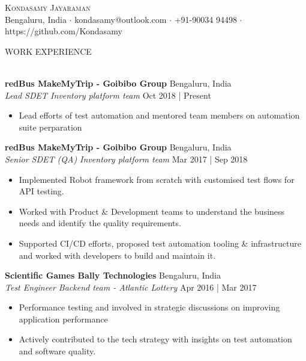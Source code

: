 \documentclass[a4paper]{article}
\newcommand{\lineunder} {
    \vspace*{-8pt} \\
    \hspace*{-18pt} \hrulefill \\
}
\newcommand{\header} [1] {
    {\hspace*{-18pt}\vspace*{6pt} \textsc{#1}}
    \vspace*{-6pt} \lineunder
}
\begin{document}
\vspace*{-40pt}

    

\vspace*{-10pt}
\begin{center}
	{\Huge \scshape {Kondasamy Jayaraman}}\\
	Bengaluru, India $\cdot$ kondasamy@outlook.com $\cdot$ +91-90034 94498 $\cdot$ https://github.com/Kondasamy\\
\end{center}

\header{WORK EXPERIENCE}
\vspace{1mm}

\textbf{redBus \textbar{} MakeMyTrip - Goibibo Group} \hfill Bengaluru, India\\
\textit{Lead SDET \textbar{} Inventory platform team} \hfill Oct 2018 | Present\\
\vspace{-1mm}
\begin{itemize} \itemsep 1pt
	\item Lead efforts of test automation and mentored team members on automation suite perparation
\end{itemize}
\textbf{redBus \textbar{} MakeMyTrip - Goibibo Group} \hfill Bengaluru, India\\
\textit{Senior SDET (QA) \textbar{} Inventory platform team} \hfill Mar 2017 | Sep 2018\\
\vspace{-1mm}
\begin{itemize} \itemsep 1pt
	\item Implemented Robot framework from scratch with customised test flows for API testing.
	\item Worked with Product \& Development teams to understand the business needs and identify the quality requirements.
	\item Supported CI/CD efforts, proposed test automation tooling \& infrastructure and worked with developers to build and maintain it.
\end{itemize}
\textbf{Scientific Games \textbar{} Bally Technologies} \hfill Bengaluru, India\\
\textit{Test Engineer \textbar{} Backend team - Atlantic Lottery} \hfill Apr 2016 | Mar 2017\\
\vspace{-1mm}
\begin{itemize} \itemsep 1pt
	\item Performance testing and involved in strategic discussions on improving application performance
	\item Actively contributed to the tech strategy with insights on test automation and software quality.
\end{itemize}
\end{document}
